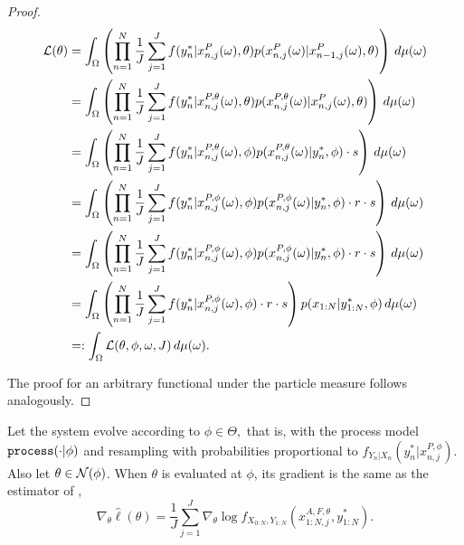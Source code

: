 \documentclass{article}
\begin{document}
\begin{proof}
    
    \begin{align}
         \mathcal{L}(\theta) 
         &= \int_\Omega \left(
         \prod_{n=1}^N \frac{1}{J} \sum_{j=1}^J f(y_n^* | x_{n,j}^P(\omega), \theta) p(x_{n,j}^P(\omega) | x_{n-1,j}^P(\omega), \theta) \right) \, d\mu(\omega) \\
         &= \int_\Omega \left(
         \prod_{n=1}^N \frac{1}{J} \sum_{j=1}^J f(y_n^* | x_{n,j}^{P,\theta}(\omega), \theta) p(x_{n,j}^{P,\theta}(\omega) | x_{n,j}^P(\omega), \theta) \right) \, d\mu(\omega) \\
         &= \int_\Omega \left(
         \prod_{n=1}^N \frac{1}{J} \sum_{j=1}^J f(y_n^* | x_{n,j}^{P,\theta}(\omega), \phi) p(x_{n,j}^{P,\theta}(\omega) | y_n^*, \phi) \cdot s  \right) \, d\mu(\omega) \\
         &= \int_\Omega \left(
         \prod_{n=1}^N \frac{1}{J} \sum_{j=1}^J f(y_n^* | x_{n,j}^{P,\phi}(\omega), \phi) p(x_{n,j}^{P,\phi}(\omega) | y_n^*, \phi) \cdot r \cdot s \right) \, d\mu(\omega) \\
         &= \int_\Omega \left(
         \prod_{n=1}^N \frac{1}{J} \sum_{j=1}^J f(y_n^* | x_{n,j}^{P,\phi}(\omega), \phi) p(x_{n,j}^{P, \phi}(\omega) | y_n^*, \phi) \cdot r \cdot s \right) \, d\mu(\omega) \\
         &= \int_\Omega \left(
         \prod_{n=1}^N \frac{1}{J} \sum_{j=1}^J f(y_n^* | x_{n,j}^{P,\phi}(\omega), \phi) \cdot r \cdot s \right)  p(x_{1:N} | y_{1:N}^*, \phi) \,  d\mu(\omega) \\
         &=: \int_\Omega \mathcal{L}(\theta,\phi,\omega, J)\, d\mu(\omega).
     \end{align}

     The proof for an arbitrary functional under the particle measure follows analogously.
\end{proof}

\begin{lem}
    Let the system evolve according to $\phi \in \Theta,$ that is, with the process model $\texttt{process}(\cdot | \phi)$ and resampling with probabilities proportional to $f_{Y_n|X_n}(y_n^* | x_{n,j}^{P,\phi})$. Also let $\theta \in {\mathcal{N}}(\phi)$. When $\theta$ is evaluated at $\phi$, its gradient is the same as the estimator of \citet{poyiadjis11},
    \begin{equation}
        \nabla_\theta \hat\ell(\theta) = \frac{1}{J}\sum_{j=1}^J \nabla_\theta \log f_{X_{0:N}, Y_{1:N}}(x_{1:N,j}^{A, F,\theta}, y_{1:N}^*).
    \end{equation}
\end{lem}
\end{document}
